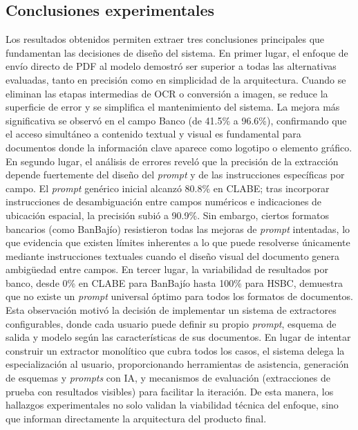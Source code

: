 \subsection{Conclusiones experimentales}

Los resultados obtenidos permiten extraer tres conclusiones principales que fundamentan las decisiones de diseño del sistema. En primer lugar, el enfoque de envío directo de PDF al modelo demostró ser superior a todas las alternativas evaluadas, tanto en precisión como en simplicidad de la arquitectura. Cuando se eliminan las etapas intermedias de OCR o conversión a imagen, se reduce la superficie de error y se simplifica el mantenimiento del sistema. La mejora más significativa se observó en el campo Banco (de 41.5\% a 96.6\%), confirmando que el acceso simultáneo a contenido textual y visual es fundamental para documentos donde la información clave aparece como logotipo o elemento gráfico. En segundo lugar, el análisis de errores reveló que la precisión de la extracción depende fuertemente del diseño del \textit{prompt} y de las instrucciones específicas por campo. El \textit{prompt} genérico inicial alcanzó 80.8\% en CLABE; tras incorporar instrucciones de desambiguación entre campos numéricos e indicaciones de ubicación espacial, la precisión subió a 90.9\%. Sin embargo, ciertos formatos bancarios (como BanBajío) resistieron todas las mejoras de \textit{prompt} intentadas, lo que evidencia que existen límites inherentes a lo que puede resolverse únicamente mediante instrucciones textuales cuando el diseño visual del documento genera ambigüedad entre campos. En tercer lugar, la variabilidad de resultados por banco, desde 0\% en CLABE para BanBajío hasta 100\% para HSBC, demuestra que no existe un \textit{prompt} universal óptimo para todos los formatos de documentos. Esta observación motivó la decisión de implementar un sistema de extractores configurables, donde cada usuario puede definir su propio \textit{prompt}, esquema de salida y modelo según las características de sus documentos. En lugar de intentar construir un extractor monolítico que cubra todos los casos, el sistema delega la especialización al usuario, proporcionando herramientas de asistencia, generación de esquemas y \textit{prompts} con IA, y mecanismos de evaluación (extracciones de prueba con resultados visibles) para facilitar la iteración. De esta manera, los hallazgos experimentales no solo validan la viabilidad técnica del enfoque, sino que informan directamente la arquitectura del producto final.
